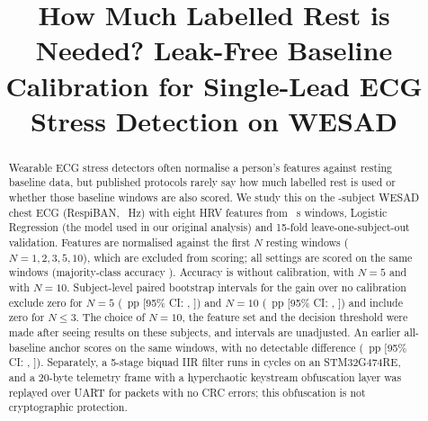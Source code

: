 \documentclass[conference]{IEEEtran}
\begin{document}
\title{How Much Labelled Rest is Needed? Leak-Free Baseline Calibration for Single-Lead ECG Stress Detection on WESAD}

\author{
}

\maketitle

\begin{abstract}
Wearable ECG stress detectors often normalise a person's features against resting baseline data, but published protocols rarely say how much labelled rest is used or whether those baseline windows are also scored. We study this on the \valNumSubjects-subject WESAD chest ECG (RespiBAN, \valSamplingRateHz~Hz) with eight HRV features from \valWindowDurationSec~s windows, Logistic Regression (the model used in our original analysis) and 15-fold leave-one-subject-out validation. Features are normalised against the first $N$ resting windows ($N = 1, 2, 3, 5, 10$), which are excluded from scoring; all settings are scored on the same \valEvalWindows windows (majority-class accuracy \valMajorityClassPct). Accuracy is \valControlNoCalibAccPct without calibration, \valNfiveAccPct with $N = 5$ and \valNtenAccPct with $N = 10$. Subject-level paired bootstrap intervals for the gain over no calibration exclude zero for $N = 5$ (\valPairedGainNfive~pp [95\% CI: \valPairedGainNfiveCILow, \valPairedGainNfiveCIHigh]) and $N = 10$ (\valPairedGainNten~pp [95\% CI: \valPairedGainNtenCILow, \valPairedGainNtenCIHigh]) and include zero for $N \le 3$. The choice of $N = 10$, the feature set and the decision threshold were made after seeing results on these subjects, and intervals are unadjusted. An earlier all-baseline anchor scores \valControlLeakyTwoNineFiveAccPct on the same windows, with no detectable difference (\valPairedGainNtenVsLeaky~pp [95\% CI: \valPairedGainNtenVsLeakyCILow, \valPairedGainNtenVsLeakyCIHigh]). Separately, a 5-stage biquad IIR filter runs in \valBiquadMeanCycles cycles on an STM32G474RE, and a 20-byte telemetry frame with a hyperchaotic keystream obfuscation layer was replayed over UART for \valHilPackets packets with no CRC errors; this obfuscation is not cryptographic protection.
\end{abstract}
\end{document}
